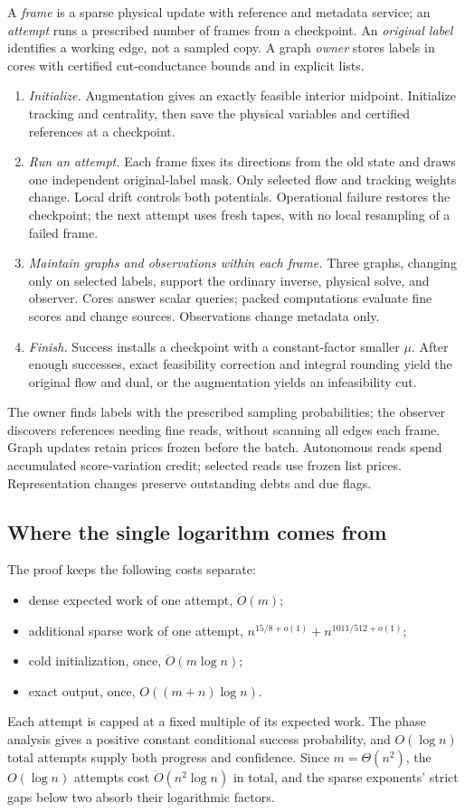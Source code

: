 \documentclass[11pt]{article}
\theoremstyle{remark}
\renewcommand{\O}{\ddot{O}}
\begin{document}
A \emph{frame} is a sparse physical update with reference and metadata
service; an \emph{attempt} runs a prescribed number of frames from a
checkpoint.
An \emph{original label} identifies a working edge, not a sampled copy.
A graph \emph{owner} stores labels in cores with certified cut-conductance
bounds and in explicit lists.
\begin{enumerate}[leftmargin=*,itemsep=3pt]
\item \emph{Initialize.}
Augmentation gives an exactly feasible interior midpoint.
Initialize tracking and centrality, then save the physical variables and
certified references at a checkpoint.
\item \emph{Run an attempt.}
Each frame fixes its directions from the old state and draws one independent
original-label mask.
Only selected flow and tracking weights change.
Local drift controls both potentials.
Operational failure restores the checkpoint; the next attempt uses fresh
tapes, with no local resampling of a failed frame.
\item \emph{Maintain graphs and observations within each frame.}
Three graphs, changing only on selected labels, support the ordinary inverse,
physical solve, and observer.
Cores answer scalar queries; packed computations evaluate fine scores and
change sources.
Observations change metadata only.
\item \emph{Finish.}
Success installs a checkpoint with a constant-factor smaller $\mu$.
After enough successes, exact feasibility correction and integral rounding
yield the original flow and dual, or the augmentation yields an infeasibility
cut.
\end{enumerate}

The owner finds labels with the prescribed sampling probabilities; the observer
discovers references needing fine reads, without scanning all edges each frame.
Graph updates retain prices frozen before the batch.
Autonomous reads spend accumulated score-variation credit; selected reads use
frozen list prices.
Representation changes preserve outstanding debts and due flags.

\subsection{Where the single logarithm comes from}

The proof keeps the following costs separate:
\begin{itemize}
\item dense expected work of one attempt, $\O(m)$;
\item additional sparse work of one attempt,
$n^{15/8+o(1)}+n^{1011/512+o(1)}$;
\item cold initialization, once, $\O(m\log n)$;
\item exact output, once, $O((m+n)\log n)$.
\end{itemize}
Each attempt is capped at a fixed multiple of its expected work.
The phase analysis gives a positive constant conditional success probability,
and $O(\log n)$ total attempts supply both progress and confidence.
Since $m=\Theta(n^2)$, the $O(\log n)$ attempts cost $\O(n^2\log n)$ in
total, and the sparse exponents' strict gaps below two absorb their
logarithmic factors.
\end{document}
